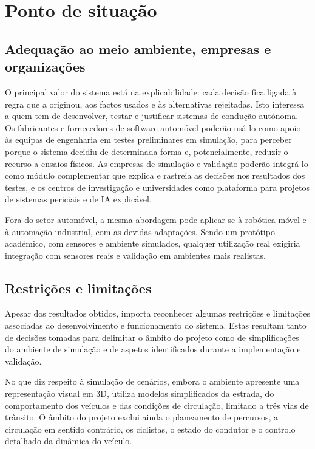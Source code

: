 
\chapter{Ponto de situação}\label{sec:7}

\section{Adequação ao meio ambiente, empresas e organizações}\label{sec:7.1}

O principal valor do sistema está na explicabilidade: cada decisão fica ligada à regra que a originou, aos factos usados e às alternativas rejeitadas. Isto interessa a quem tem de desenvolver, testar e justificar sistemas de condução autónoma. Os fabricantes e fornecedores de software automóvel poderão usá-lo como apoio às equipas de engenharia em testes preliminares em simulação, para perceber porque o sistema decidiu de determinada forma e, potencialmente, reduzir o recurso a ensaios físicos. As empresas de simulação e validação poderão integrá-lo como módulo complementar que explica e rastreia as decisões nos resultados dos testes, e os centros de investigação e universidades como plataforma para projetos de sistemas periciais e de IA explicável.

Fora do setor automóvel, a mesma abordagem pode aplicar-se à robótica móvel e à automação industrial, com as devidas adaptações. Sendo um protótipo académico, com sensores e ambiente simulados, qualquer utilização real exigiria integração com sensores reais e validação em ambientes mais realistas.

\section{Restrições e limitações}\label{sec:7.2}

Apesar dos resultados obtidos, importa reconhecer algumas restrições e limitações associadas ao desenvolvimento e funcionamento do sistema. Estas resultam tanto de decisões tomadas para delimitar o âmbito do projeto como de simplificações do ambiente de simulação e de aspetos identificados durante a implementação e validação.

No que diz respeito à simulação de cenários, embora o ambiente apresente uma representação visual em 3D, utiliza modelos simplificados da estrada, do comportamento dos veículos e das condições de circulação, limitado a três vias de trânsito. O âmbito do projeto exclui ainda o planeamento de percursos, a circulação em sentido contrário, os ciclistas, o estado do condutor e o controlo detalhado da dinâmica do veículo.

